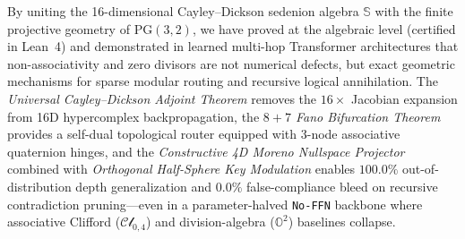 \documentclass[11pt,a4paper]{article}
\theoremstyle{definition}
\theoremstyle{remark}
\newcommand{\Oc}{\mathbb{O}}
\newcommand{\Se}{\mathbb{S}}
\newcommand{\PG}{\mathrm{PG}}
\begin{document}
By uniting the 16-dimensional Cayley--Dickson sedenion algebra $\Se$ with the finite projective geometry of $\PG(3,2)$, we have proved at the algebraic level (certified in Lean~4) and demonstrated in learned multi-hop Transformer architectures that non-associativity and zero divisors are not numerical defects, but exact geometric mechanisms for sparse modular routing and recursive logical annihilation. The \textit{Universal Cayley--Dickson Adjoint Theorem} removes the $16\times$ Jacobian expansion from 16D hypercomplex backpropagation, the \textit{$8+7$ Fano Bifurcation Theorem} provides a self-dual topological router equipped with 3-node associative quaternion hinges, and the \textit{Constructive 4D Moreno Nullspace Projector} combined with \textit{Orthogonal Half-Sphere Key Modulation} enables $100.0\%$ out-of-distribution depth generalization and $0.0\%$ false-compliance bleed on recursive contradiction pruning---even in a parameter-halved \texttt{No-FFN} backbone \cite{Ji2026CliffordNet} where associative Clifford ($\mathcal{Cl}_{0,4}$) and division-algebra ($\Oc^2$) baselines collapse.
\end{document}
